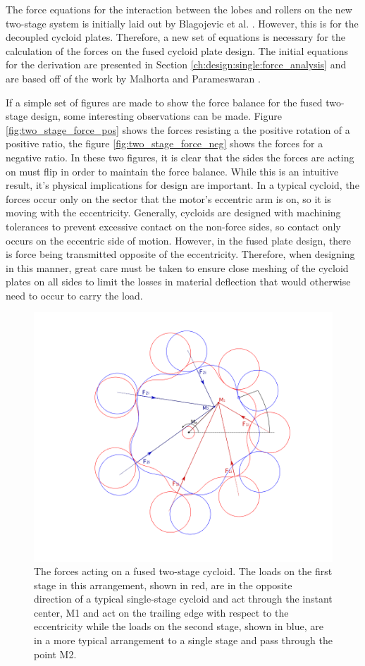 The force equations for the interaction between the lobes and rollers on the new two-stage system is initially laid out by Blagojevic et al. \cite{ref:new_two_stage}. However, this is for the decoupled cycloid plates. Therefore, a new set of equations is necessary for the calculation of the forces on the fused cycloid plate design. The initial equations for the derivation are presented in Section \ref{ch:design:single:force_analysis} and are based off of the work by Malhorta and Parameswaran \cite{ref:malhorta_2}. 

If a simple set of figures are made to show the force balance for the fused two-stage design, some interesting observations can be made. Figure \ref{fig:two_stage_force_pos} shows the forces resisting a the positive rotation of a positive ratio, the figure \ref{fig:two_stage_force_neg} shows the forces for a negative ratio. In these two figures, it is clear that the sides the forces are acting on must flip in order to maintain the force balance. While this is an intuitive result, it's physical implications for design are important. In a typical cycloid, the forces occur only on the sector that the motor's eccentric arm is on, so it is moving with the eccentricity. Generally, cycloids are designed with machining tolerances to prevent excessive contact on the non-force sides, so contact only occurs on the eccentric side of motion. However, in the fused plate design, there is force being transmitted opposite of the eccentricity. Therefore, when designing in this manner, great care must be taken to ensure close meshing of the cycloid plates on all sides to limit the losses in material deflection that would otherwise need to occur to carry the load. 


\begin{figure}[h]
	\centering
	\includegraphics[width=0.80\linewidth]{fig/two_stage_loads_pos}
   \caption{The forces acting on a fused two-stage cycloid. The loads on the first stage in this arrangement, shown in red, are in the opposite direction of a typical single-stage cycloid and act through the instant center, M1 and act on the trailing edge with respect to the eccentricity while the loads on the second stage, shown in blue, are in a more typical arrangement to a single stage and pass through the point M2. }
\end{figure}

